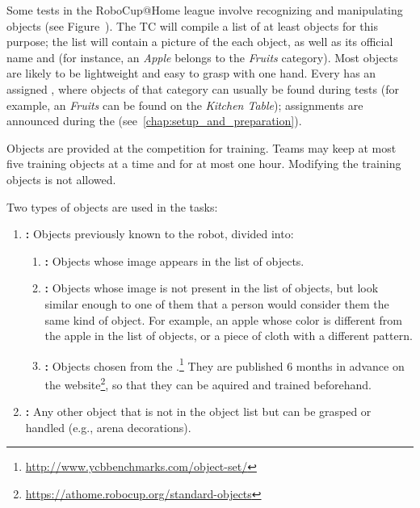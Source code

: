 Some tests in the RoboCup@Home league involve recognizing and manipulating objects (see Figure~).
The TC will compile a list of at least \NumObjects objects for this purpose; the list will contain a picture of the each object, as well as its official name and \ObjectCategory{} (for instance, an \textit{Apple} belongs to the \textit{Fruits} category).
Most objects are likely to be lightweight and easy to grasp with one hand.
Every \ObjectCategory{} has an assigned \PredefinedLocation, where objects of that category can usually be found during tests (for example, an \textit{Fruits} can be found on the \textit{Kitchen Table}); assignments are announced during the \SetupDays{} (see~\ref{chap:setup_and_preparation}).

Objects are provided at the competition for training.
Teams may keep at most five training objects at a time and for at most one hour.
Modifying the training objects is not allowed.

Two types of objects are used in the tasks:
\begin{enumerate}
	\item \textbf{\KnownObjects{}:} Objects previously known to the robot, divided into:
	\begin{enumerate}
		\item \textbf{\ConsistentObjects{}:} Objects whose image appears in the list of objects.
		\item \textbf{\SimilarObjects{}:} Objects whose image is not present in the list of objects, but look similar enough to one of them that a person would consider them the same kind of object. For example, an apple whose color is different from the apple in the list of objects, or a piece of cloth with a different pattern.
		\item \textbf{\StandardObjects{}:} Objects chosen from the \YCBData{}.\footnote{\url{http://www.ycbbenchmarks.com/object-set/}} They are published 6 months in advance on the \RoboCup\AtHome{} website\footnote{\url{https://athome.robocup.org/standard-objects}}, so that they can be aquired and trained beforehand.
	\end{enumerate}
	\item \textbf{\UnknownObjects{}:} Any other object that is not in the object list but can be grasped or handled (e.g., arena decorations).
\end{enumerate}

